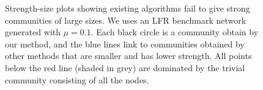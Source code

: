 \begin{figure}
    \centering
    \def\svgwidth{\columnwidth}
    \fontsize{10}{10}\selectfont
    
    \hfill
    \vspace{-.5em}
    \caption{Strength-size plots showing existing algorithms fail to give strong communities of large sizes. We uses an LFR benchmark network~\cite{lancichinetti2009benchmarks} generated with $\mu=0.1$. Each black circle is a community obtain by our method, and the blue lines link to communities obtained by other methods that are smaller and has lower strength. All points below the red line (shaded in grey) are dominated by the trivial community consisting of all the nodes.}

  \label{fig:LFR}
\end{figure}


